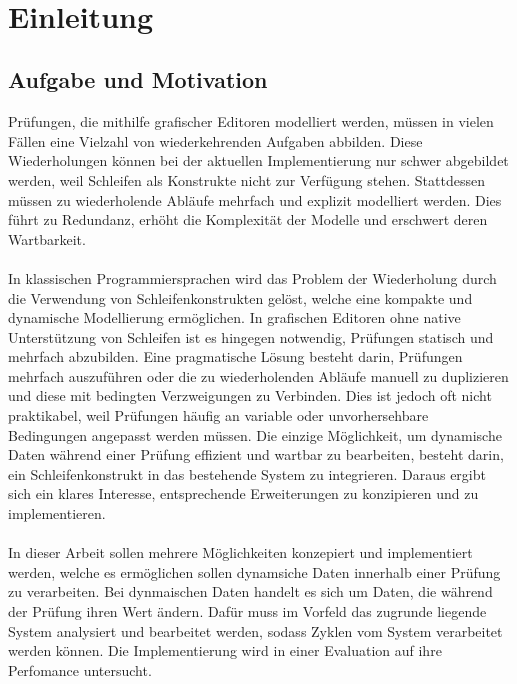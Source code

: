     \newpage
    \begin{lstlisting}
        
    \end{lstlisting}   
    \chapter{Einleitung}
    \section{Aufgabe und Motivation}
    Prüfungen, die mithilfe grafischer Editoren modelliert werden, müssen in vielen Fällen eine Vielzahl von wiederkehrenden Aufgaben abbilden. 
    Diese Wiederholungen können bei der aktuellen Implementierung nur schwer abgebildet werden, weil Schleifen als Konstrukte nicht zur Verfügung stehen. 
    Stattdessen müssen zu wiederholende Abläufe mehrfach und explizit modelliert werden. 
    Dies führt zu Redundanz, erhöht die Komplexität der Modelle und erschwert deren Wartbarkeit.\\
    \\
    In klassischen Programmiersprachen wird das Problem der Wiederholung durch die Verwendung von Schleifenkonstrukten gelöst, welche eine kompakte und dynamische Modellierung ermöglichen. 
    In grafischen Editoren ohne native Unterstützung von Schleifen ist es hingegen notwendig, Prüfungen statisch und mehrfach abzubilden. 
    Eine pragmatische Lösung besteht darin, Prüfungen mehrfach auszuführen oder die zu wiederholenden Abläufe manuell zu duplizieren und diese mit bedingten Verzweigungen zu Verbinden. 
    Dies ist jedoch oft nicht praktikabel, weil Prüfungen häufig an variable oder unvorhersehbare Bedingungen angepasst werden müssen.
    Die einzige Möglichkeit, um dynamische Daten während einer Prüfung effizient und wartbar zu bearbeiten, besteht darin, ein Schleifenkonstrukt in das bestehende System zu integrieren. 
    Daraus ergibt sich ein klares Interesse, entsprechende Erweiterungen zu konzipieren und zu implementieren.\\
    \\
    In dieser Arbeit sollen mehrere Möglichkeiten konzepiert und implementiert werden, welche es ermöglichen sollen dynamsiche Daten innerhalb einer Prüfung zu verarbeiten.
    Bei dynmaischen Daten handelt es sich um Daten, die während der Prüfung ihren Wert ändern.
    Dafür muss im Vorfeld das zugrunde liegende System analysiert und bearbeitet werden, sodass Zyklen vom System verarbeitet werden können.
    Die Implementierung wird in einer Evaluation auf ihre Perfomance untersucht.
